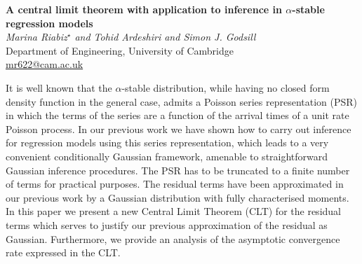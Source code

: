 \documentclass[12pt]{article}
\newcommand{\postertitle}[1]{{\Large\bf #1}\\[12pt]}
\newcommand{\authors}[1]{\emph{#1}\\}
\newcommand{\affiliations}[1]{{#1}\\}
\newcommand{\contacts}[1]{{#1}}
\begin{document}
\begin{center}
\vspace*{0.5cm}
%
\postertitle{A central limit theorem with application to inference in $\alpha$-stable regression models}
%
\authors{Marina Riabiz$^\star$ and Tohid Ardeshiri and Simon J. Godsill} %
% 
\affiliations{Department of Engineering, University of Cambridge}
%
\contacts{\url{mr622@cam.ac.uk}} %
%
\vspace*{0.3cm}
\end{center}

It is well known that the $\alpha$-stable distribution, while having no closed form density function
in the general case, admits a Poisson series representation (PSR) in which the terms of the
series are a function of the arrival times of a unit rate Poisson process. In our previous
work we have shown how to carry out inference for regression models using this series representation,
which leads to a very convenient conditionally Gaussian framework, amenable
to straightforward Gaussian inference procedures. The PSR has to be truncated to a finite
number of terms for practical purposes. The residual terms have been approximated in
our previous work by a Gaussian distribution with fully characterised moments. In this
paper we present a new Central Limit Theorem (CLT) for the residual terms which serves
to justify our previous approximation of the residual as Gaussian. Furthermore, we provide
an analysis of the asymptotic convergence rate expressed in the CLT.


\end{document}
